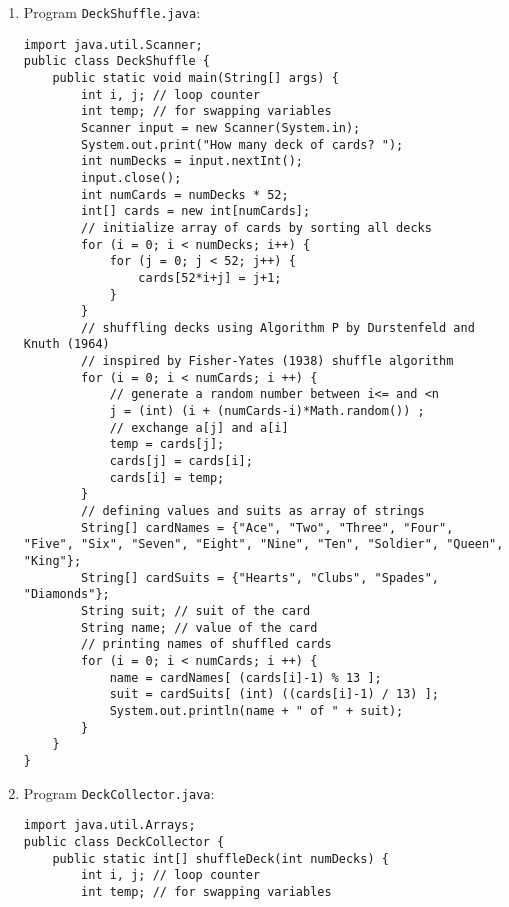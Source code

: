 \documentclass[12pt,letterpaper,twoside]{article}
\begin{document}
\begin{enumerate}
\item Program \texttt{DeckShuffle.java}:
\lstset{language=java}
\begin{lstlisting}
import java.util.Scanner;
public class DeckShuffle {
	public static void main(String[] args) {
		int i, j; // loop counter
		int temp; // for swapping variables
		Scanner input = new Scanner(System.in);
		System.out.print("How many deck of cards? ");
		int numDecks = input.nextInt();
		input.close();
		int numCards = numDecks * 52;
		int[] cards = new int[numCards];
		// initialize array of cards by sorting all decks
		for (i = 0; i < numDecks; i++) {
			for (j = 0; j < 52; j++) {
				cards[52*i+j] = j+1;
			}
		}
		// shuffling decks using Algorithm P by Durstenfeld and Knuth (1964)
		// inspired by Fisher-Yates (1938) shuffle algorithm
		for (i = 0; i < numCards; i ++) {
			// generate a random number between i<= and <n
			j = (int) (i + (numCards-i)*Math.random()) ;
			// exchange a[j] and a[i]
			temp = cards[j];
			cards[j] = cards[i];
			cards[i] = temp;
		}
		// defining values and suits as array of strings
		String[] cardNames = {"Ace", "Two", "Three", "Four", "Five", "Six", "Seven", "Eight", "Nine", "Ten", "Soldier", "Queen", "King"};
		String[] cardSuits = {"Hearts", "Clubs", "Spades", "Diamonds"};
		String suit; // suit of the card
		String name; // value of the card
		// printing names of shuffled cards
		for (i = 0; i < numCards; i ++) {
			name = cardNames[ (cards[i]-1) % 13 ];
			suit = cardSuits[ (int) ((cards[i]-1) / 13) ];
			System.out.println(name + " of " + suit);
		}
	}
}
\end{lstlisting}
\item Program \texttt{DeckCollector.java}:
\lstset{language=java}
\begin{lstlisting}
import java.util.Arrays;
public class DeckCollector {
	public static int[] shuffleDeck(int numDecks) {
		int i, j; // loop counter
		int temp; // for swapping variables


\end{lstlisting}
\end{enumerate}
\end{document}
